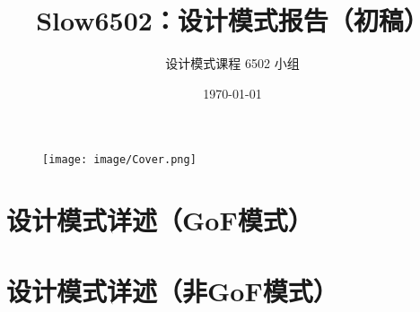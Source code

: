 \documentclass[cn,black,12pt,normal]{elegantnote}
\title{Slow6502：设计模式报告（初稿）}
\author{设计模式课程 6502 小组}
\institute{软件学院}
\date{\today}
\begin{document}
\maketitle

\begin{figure}[H]
    \centering
    \texttt{[image: image/Cover.png]}
\end{figure}



\newpage

\tableofcontents



\newpage

\section{设计模式详述（GoF模式）}
























\section{设计模式详述（非GoF模式）}









\newpage








\end{document}

